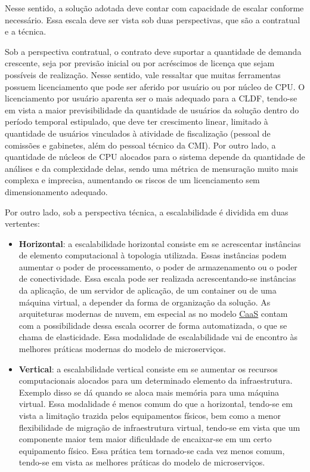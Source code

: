 Nesse sentido, a solução adotada deve contar com capacidade de escalar conforme necessário. Essa escala deve ser vista sob duas perspectivas, que são a contratual e a técnica.

Sob a perspectiva contratual, o contrato deve suportar a quantidade de demanda crescente, seja por previsão inicial ou por acréscimos de licença que sejam possíveis de realização. Nesse sentido, vale ressaltar que muitas ferramentas possuem licenciamento que pode ser aferido por usuário ou por núcleo de CPU. O licenciamento por usuário aparenta ser o mais adequado para a CLDF, tendo-se em vista a maior previsibilidade da quantidade de usuários da solução dentro do período temporal estipulado, que deve ter crescimento linear, limitado à quantidade de usuários vinculados à atividade de fiscalização (pessoal de comissões e gabinetes, além do pessoal técnico da CMI). Por outro lado, a quantidade de núcleos de CPU alocados para o sistema depende da quantidade de análises e da complexidade delas, sendo uma métrica de mensuração muito mais complexa e imprecisa, aumentando os riscos de um licenciamento sem dimensionamento adequado.

Por outro lado, sob a perspectiva técnica, a escalabilidade é dividida em duas vertentes:
\begin{itemize}
    \item \textbf{Horizontal}: a escalabilidade horizontal consiste em se acrescentar instâncias de elemento computacional à topologia utilizada. Essas instâncias podem aumentar o poder de processamento, o poder de armazenamento ou o poder de conectividade. Essa escala pode ser realizada acrescentando-se instâncias da aplicação, de um servidor de aplicação, de um container ou de uma máquina virtual, a depender da forma de organização da solução. As arquiteturas modernas de nuvem, em especial as no modelo \hyperref[caas]{CaaS} contam com a possibilidade dessa escala ocorrer de forma automatizada, o que se chama de elasticidade. Essa modalidade de escalabilidade vai de encontro às melhores práticas modernas do modelo de microserviços.
    \item \textbf{Vertical}: a escalabilidade vertical consiste em se aumentar os recursos computacionais alocados para um determinado elemento da infraestrutura. Exemplo disso se dá quando se aloca mais memória para uma máquina virtual. Essa modalidade é menos comum do que a horizontal, tendo-se em vista a limitação trazida pelos equipamentos físicos, bem como a menor flexibilidade de migração de infraestrutura virtual, tendo-se em vista que um componente maior tem maior dificuldade de encaixar-se em um certo equipamento físico. Essa prática tem tornado-se cada vez menos comum, tendo-se em vista as melhores práticas do modelo de microserviços.
\end{itemize}

